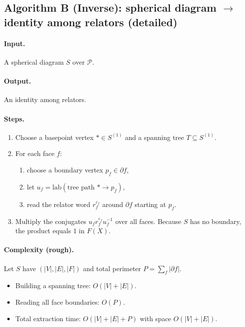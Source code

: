 \documentclass[11pt]{article}
\theoremstyle{definition}
\theoremstyle{plain}
\theoremstyle{remark}
\newcommand{\lab}{\mathrm{lab}}
\begin{document}
\subsection*{Algorithm B (Inverse): spherical diagram $\to$ identity among relators (detailed)}\cite{gersten1987,lyndonschupp1977}
\paragraph{Input.} A spherical diagram $S$ over $\mathcal P$.
\paragraph{Output.} An identity among relators.

\paragraph{Steps.}
\begin{enumerate}[leftmargin=2.2em]
\item Choose a basepoint vertex $*\in S^{(1)}$ and a spanning tree $T\subseteq S^{(1)}$.
\item For each face $f$:
\begin{enumerate}[leftmargin=2em]
\item choose a boundary vertex $p_f\in\partial f$,
\item let $u_f=\lab(\text{tree path }*\to p_f)$,
\item read the relator word $r_f^{\varepsilon_f}$ around $\partial f$ starting at $p_f$.
\end{enumerate}
\item Multiply the conjugates $u_f r_f^{\varepsilon_f}u_f^{-1}$ over all faces.
Because $S$ has no boundary, the product equals $1$ in $F(X)$.
\end{enumerate}



\paragraph{Complexity (rough).}\cite{gersten1987}
Let $S$ have $(|V|,|E|,|F|)$ and total perimeter $P=\sum_f|\partial f|$.
\begin{itemize}[leftmargin=2em]
\item Building a spanning tree: $O(|V|+|E|)$.
\item Reading all face boundaries: $O(P)$.
\item Total extraction time: $O(|V|+|E|+P)$ with space $O(|V|+|E|)$.
\end{itemize}
\end{document}
